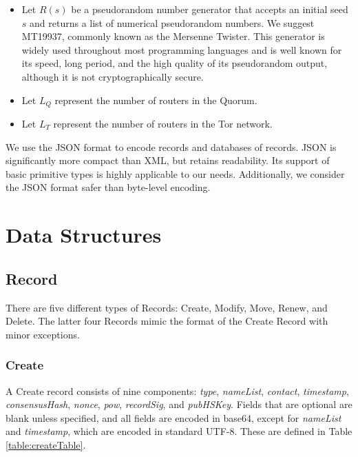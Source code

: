 \begin{itemize}
	\item Let $ \mathit{R}(s) $ be a pseudorandom number generator that accepts an initial seed $ s $ and returns a list of numerical pseudorandom numbers. We suggest MT19937, commonly known as the Mersenne Twister. This generator is widely used throughout most programming languages and is well known for its speed, long period, and the high quality of its pseudorandom output, although it is not cryptographically secure.\cite{matsumoto1998mersenne}
	\item Let $ L_{Q} $ represent the number of routers in the Quorum.
	\item Let $ L_{T} $ represent the number of routers in the Tor network.
\end{itemize}

We use the JSON format to encode records and databases of records. JSON is significantly more compact than XML, but retains readability. Its support of basic primitive types is highly applicable to our needs. Additionally, we consider the JSON format safer than byte-level encoding.

\section{Data Structures}
\label{sec:DataStructures}

\subsection{Record}
\label{sec:Record}


There are five different types of Records: Create, Modify, Move, Renew, and Delete. The latter four Records mimic the format of the Create Record with minor exceptions.

\subsubsection{Create}

A Create record consists of nine components: \emph{type}, \emph{nameList}, \emph{contact}, \emph{timestamp}, \emph{consensusHash}, \emph{nonce}, \emph{pow}, \emph{recordSig}, and \emph{pubHSKey}. Fields that are optional are blank unless specified, and all fields are encoded in base64, except for \emph{nameList} and \emph{timestamp}, which are encoded in standard UTF-8. These are defined in Table \ref{table:createTable}.

